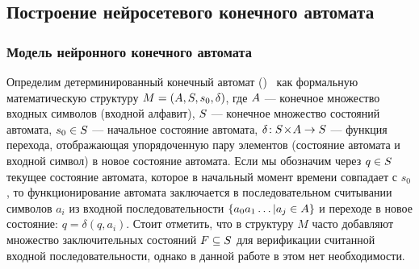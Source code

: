 %
%
%
%


\subsection{Построение нейросетевого конечного автомата}


\subsubsection{Модель нейронного конечного автомата}

Определим детерминированный конечный автомат ()~\cite{Hopcroft2008} как формальную математическую структуру $M = \left( A, S, s_{0}, \delta \right)$, где $A$ --- конечное множество входных символов (входной алфавит), $S$ --- конечное множество состояний автомата, $s_{0} \in S$ --- начальное состояние автомата, $\delta\!: S\!\times\!A \to S$ --- функция перехода, отображающая упорядоченную пару элементов (состояние автомата и входной символ) в новое состояние автомата. Если мы обозначим через $q \in S$ текущее состояние автомата, которое в начальный момент времени совпадает с $s_{0}$, то функционирование автомата заключается в последовательном считывании символов $a_{i}$ из входной последовательности $\left\{ a_{0} a_{1} \ldots | a_{j} \in A \right\}$ и переходе в новое состояние: $q = \delta \left( q, a_{i} \right)$. Стоит отметить, что в структуру $M$ часто добавляют множество \socalled заключительных состояний $F \subseteq S$ для верификации считанной входной последовательности, однако в данной работе в этом нет необходимости.

